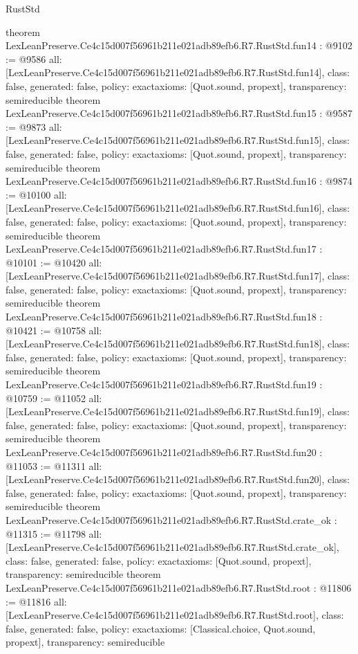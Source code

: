 \begin{lexlean}{RustStd}
\begin{coremodule}
{}
theorem LexLeanPreserve.Ce4c15d007f56961b211e021adb89efb6.R7.RustStd.fun14 : @9102 := @9586 {
  all: [LexLeanPreserve.Ce4c15d007f56961b211e021adb89efb6.R7.RustStd.fun14],
  class: false,
  generated: false,
  policy: exact{axioms: [Quot.sound, propext]},
  transparency: semireducible
}
theorem LexLeanPreserve.Ce4c15d007f56961b211e021adb89efb6.R7.RustStd.fun15 : @9587 := @9873 {
  all: [LexLeanPreserve.Ce4c15d007f56961b211e021adb89efb6.R7.RustStd.fun15],
  class: false,
  generated: false,
  policy: exact{axioms: [Quot.sound, propext]},
  transparency: semireducible
}
theorem LexLeanPreserve.Ce4c15d007f56961b211e021adb89efb6.R7.RustStd.fun16 : @9874 := @10100 {
  all: [LexLeanPreserve.Ce4c15d007f56961b211e021adb89efb6.R7.RustStd.fun16],
  class: false,
  generated: false,
  policy: exact{axioms: [Quot.sound, propext]},
  transparency: semireducible
}
theorem LexLeanPreserve.Ce4c15d007f56961b211e021adb89efb6.R7.RustStd.fun17 : @10101 := @10420 {
  all: [LexLeanPreserve.Ce4c15d007f56961b211e021adb89efb6.R7.RustStd.fun17],
  class: false,
  generated: false,
  policy: exact{axioms: [Quot.sound, propext]},
  transparency: semireducible
}
theorem LexLeanPreserve.Ce4c15d007f56961b211e021adb89efb6.R7.RustStd.fun18 : @10421 := @10758 {
  all: [LexLeanPreserve.Ce4c15d007f56961b211e021adb89efb6.R7.RustStd.fun18],
  class: false,
  generated: false,
  policy: exact{axioms: [Quot.sound, propext]},
  transparency: semireducible
}
theorem LexLeanPreserve.Ce4c15d007f56961b211e021adb89efb6.R7.RustStd.fun19 : @10759 := @11052 {
  all: [LexLeanPreserve.Ce4c15d007f56961b211e021adb89efb6.R7.RustStd.fun19],
  class: false,
  generated: false,
  policy: exact{axioms: [Quot.sound, propext]},
  transparency: semireducible
}
theorem LexLeanPreserve.Ce4c15d007f56961b211e021adb89efb6.R7.RustStd.fun20 : @11053 := @11311 {
  all: [LexLeanPreserve.Ce4c15d007f56961b211e021adb89efb6.R7.RustStd.fun20],
  class: false,
  generated: false,
  policy: exact{axioms: [Quot.sound, propext]},
  transparency: semireducible
}
theorem LexLeanPreserve.Ce4c15d007f56961b211e021adb89efb6.R7.RustStd.crate_ok : @11315 := @11798 {
  all: [LexLeanPreserve.Ce4c15d007f56961b211e021adb89efb6.R7.RustStd.crate_ok],
  class: false,
  generated: false,
  policy: exact{axioms: [Quot.sound, propext]},
  transparency: semireducible
}
theorem LexLeanPreserve.Ce4c15d007f56961b211e021adb89efb6.R7.RustStd.root : @11806 := @11816 {
  all: [LexLeanPreserve.Ce4c15d007f56961b211e021adb89efb6.R7.RustStd.root],
  class: false,
  generated: false,
  policy: exact{axioms: [Classical.choice, Quot.sound, propext]},
  transparency: semireducible
}


\end{coremodule}
\end{lexlean}
